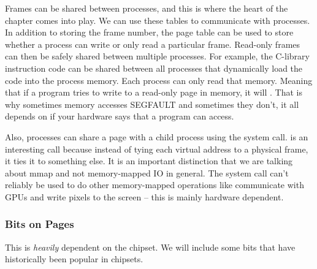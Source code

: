 Frames can be shared between processes, and this is where the heart of the chapter comes into play.
We can use these tables to communicate with processes.
In addition to storing the frame number, the page table can be used to store whether a process can write or only read a particular frame.
Read-only frames can then be safely shared between multiple processes.
For example, the C-library instruction code can be shared between all processes that dynamically load the code into the process memory.
Each process can only read that memory.
Meaning that if a program tries to write to a read-only page in memory, it will .
That is why sometimes memory accesses SEGFAULT and sometimes they don't, it all depends on if your hardware says that a program can access.
	 
Also, processes can share a page with a child process using the  system call.
 is an interesting call because instead of tying each virtual address to a physical frame, it ties it to something else. It is an important distinction that we are talking about mmap and not memory-mapped IO in general. The  system call can't reliably be used to do other memory-mapped operations like communicate with GPUs and write pixels to the screen -- this is mainly hardware dependent.
	 
\subsubsection{Bits on Pages}
	 
This is \textit{heavily} dependent on the chipset.
We will include some bits that have historically been popular in chipsets.
	 
